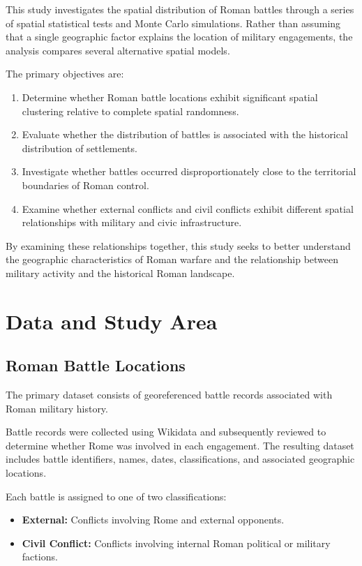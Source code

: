 \documentclass[
  letterpaper,
  DIV=11,
  numbers=noendperiod]{scrartcl}
\providecommand{\tightlist}{%
  \setlength{\itemsep}{0pt}\setlength{\parskip}{0pt}}\usepackage{longtable,booktabs,array}
\begin{document}
This study investigates the spatial distribution of Roman battles
through a series of spatial statistical tests and Monte Carlo
simulations. Rather than assuming that a single geographic factor
explains the location of military engagements, the analysis compares
several alternative spatial models.

The primary objectives are:

\begin{enumerate}
\def\labelenumi{\arabic{enumi}.}
\tightlist
\item
  Determine whether Roman battle locations exhibit significant spatial
  clustering relative to complete spatial randomness.
\item
  Evaluate whether the distribution of battles is associated with the
  historical distribution of settlements.
\item
  Investigate whether battles occurred disproportionately close to the
  territorial boundaries of Roman control.
\item
  Examine whether external conflicts and civil conflicts exhibit
  different spatial relationships with military and civic
  infrastructure.
\end{enumerate}

By examining these relationships together, this study seeks to better
understand the geographic characteristics of Roman warfare and the
relationship between military activity and the historical Roman
landscape.

\section{Data and Study Area}\label{data-and-study-area}

\subsection{Roman Battle Locations}\label{roman-battle-locations}

The primary dataset consists of georeferenced battle records associated
with Roman military history.

Battle records were collected using Wikidata and subsequently reviewed
to determine whether Rome was involved in each engagement. The resulting
dataset includes battle identifiers, names, dates, classifications, and
associated geographic locations.

Each battle is assigned to one of two classifications:

\begin{itemize}
\tightlist
\item
  \textbf{External:} Conflicts involving Rome and external opponents.
\item
  \textbf{Civil Conflict:} Conflicts involving internal Roman political
  or military factions.
\end{itemize}
\end{document}

